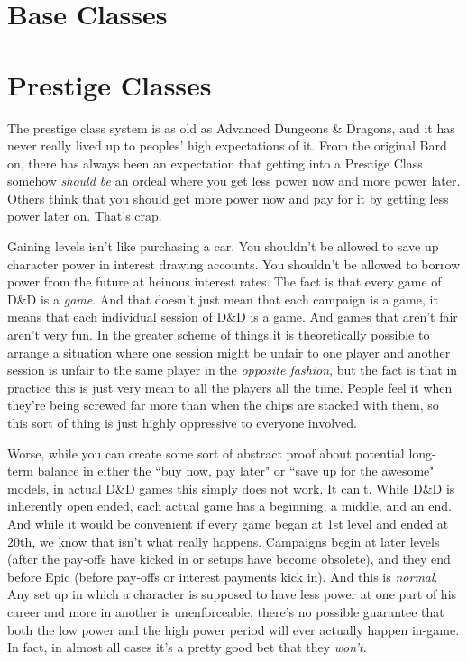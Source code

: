 \documentclass[10pt]{report}
\begin{document}
\section{Base Classes}






\section{Prestige Classes}

The prestige class system is as old as Advanced Dungeons \& Dragons, and it has never really lived up to peoples' high expectations of it. From the original Bard on, there has always been an expectation that getting into a Prestige Class somehow \emph{should be} an ordeal where you get less power now and more power later. Others think that you should get more power now and pay for it by getting less power later on. That's crap.

Gaining levels isn't like purchasing a car. You shouldn't be allowed to save up character power in interest drawing accounts. You shouldn't be allowed to borrow power from the future at heinous interest rates. The fact is that every game of D\&D is a \emph{game}. And that doesn't just mean that each campaign is a game, it means that each individual session of D\&D is a game. And games that aren't fair aren't very fun. In the greater scheme of things it is theoretically possible to arrange a situation where one session might be unfair to one player and another session is unfair to the same player in the \emph{opposite fashion}, but the fact is that in practice this is just very mean to all the players all the time. People feel it when they're being screwed far more than when the chips are stacked with them, so this sort of thing is just highly oppressive to everyone involved.

Worse, while you can create some sort of abstract proof about potential long-term balance in either the ``buy now, pay later" or ``save up for the awesome" models, in actual D\&D games this simply does not work. It can't. While D\&D is inherently open ended, each actual game has a beginning, a middle, and an end. And while it would be convenient if every game began at 1st level and ended at 20th, we know that isn't what really happens. Campaigns begin at later levels (after the pay-offs have kicked in or setups have become obsolete), and they end before Epic (before pay-offs or interest payments kick in). And this is \emph{normal}. Any set up in which a character is supposed to have less power at one part of his career and more in another is unenforceable, there's no possible guarantee that both the low power and the high power period will ever actually happen in-game. In fact, in almost all cases it's a pretty good bet that they \emph{won't}.
\end{document}
